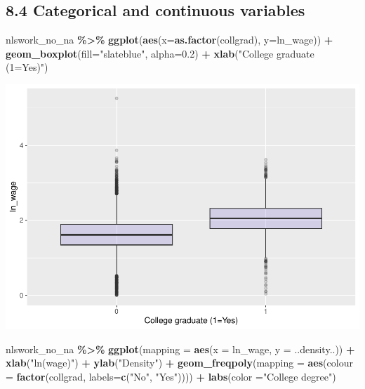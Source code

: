 \documentclass[
]{article}
\newenvironment{Shaded}{\begin{snugshade}}{\end{snugshade}}
\newcommand{\AttributeTok}[1]{\textcolor[rgb]{0.13,0.29,0.53}{#1}}
\newcommand{\FloatTok}[1]{\textcolor[rgb]{0.00,0.00,0.81}{#1}}
\newcommand{\FunctionTok}[1]{\textcolor[rgb]{0.13,0.29,0.53}{\textbf{#1}}}
\newcommand{\NormalTok}[1]{#1}
\newcommand{\SpecialCharTok}[1]{\textcolor[rgb]{0.81,0.36,0.00}{\textbf{#1}}}
\newcommand{\StringTok}[1]{\textcolor[rgb]{0.31,0.60,0.02}{#1}}
\begin{document}
\hypertarget{categorical-and-continuous-variables}{%
\subsection{8.4 Categorical and continuous
variables}\label{categorical-and-continuous-variables}}

\begin{Shaded}
\begin{Highlighting}[]
\NormalTok{nlswork\_no\_na }\SpecialCharTok{\%\textgreater{}\%} \FunctionTok{ggplot}\NormalTok{(}\FunctionTok{aes}\NormalTok{(}\AttributeTok{x=}\FunctionTok{as.factor}\NormalTok{(collgrad), }\AttributeTok{y=}\NormalTok{ln\_wage)) }\SpecialCharTok{+}
  \FunctionTok{geom\_boxplot}\NormalTok{(}\AttributeTok{fill=}\StringTok{"slateblue"}\NormalTok{, }\AttributeTok{alpha=}\FloatTok{0.2}\NormalTok{) }\SpecialCharTok{+} 
  \FunctionTok{xlab}\NormalTok{(}\StringTok{"College graduate (1=Yes)"}\NormalTok{)}
\end{Highlighting}
\end{Shaded}

\includegraphics{RIntro_files/figure-latex/unnamed-chunk-21-1.pdf}

\begin{Shaded}
\begin{Highlighting}[]
\NormalTok{nlswork\_no\_na }\SpecialCharTok{\%\textgreater{}\%} \FunctionTok{ggplot}\NormalTok{(}\AttributeTok{mapping =} \FunctionTok{aes}\NormalTok{(}\AttributeTok{x =}\NormalTok{ ln\_wage, }\AttributeTok{y =}\NormalTok{ ..density..)) }\SpecialCharTok{+}
    \FunctionTok{xlab}\NormalTok{(}\StringTok{"ln(wage)"}\NormalTok{) }\SpecialCharTok{+}
    \FunctionTok{ylab}\NormalTok{(}\StringTok{"Density"}\NormalTok{) }\SpecialCharTok{+}
    \FunctionTok{geom\_freqpoly}\NormalTok{(}\AttributeTok{mapping =} \FunctionTok{aes}\NormalTok{(}\AttributeTok{colour =} \FunctionTok{factor}\NormalTok{(collgrad, }\AttributeTok{labels=}\FunctionTok{c}\NormalTok{(}\StringTok{"No"}\NormalTok{, }\StringTok{"Yes"}\NormalTok{)))) }\SpecialCharTok{+}
  \FunctionTok{labs}\NormalTok{(}\AttributeTok{color =}\StringTok{"College degree"}\NormalTok{)}
\end{Highlighting}
\end{Shaded}
\end{document}
